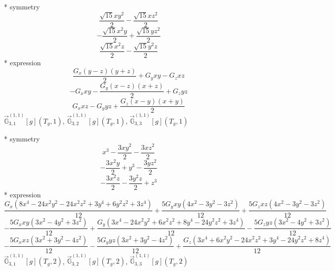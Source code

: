 \documentclass[fleqn,8pt]{jsarticle}
\begin{document}
\noindent\quad ** symmetry
\begin{dmath*}
\frac{\sqrt{15} x y^{2}}{2} - \frac{\sqrt{15} x z^{2}}{2}
\end{dmath*}
\begin{dmath*}
- \frac{\sqrt{15} x^{2} y}{2} + \frac{\sqrt{15} y z^{2}}{2}
\end{dmath*}
\begin{dmath*}
\frac{\sqrt{15} x^{2} z}{2} - \frac{\sqrt{15} y^{2} z}{2}
\end{dmath*}
\noindent\quad ** expression
\begin{dmath*}
\frac{G_{x} \left(y - z\right) \left(y + z\right)}{2} + G_{y} x y - G_{z} x z
\end{dmath*}
\begin{dmath*}
- G_{x} x y - \frac{G_{y} \left(x - z\right) \left(x + z\right)}{2} + G_{z} y z
\end{dmath*}
\begin{dmath*}
G_{x} x z - G_{y} y z + \frac{G_{z} \left(x - y\right) \left(x + y\right)}{2}
\end{dmath*}
\noindent\quad $\vec{\mathbb{G}}_{3,1}^{(1,1)}[g](T_{g},1)$, $\vec{\mathbb{G}}_{3,2}^{(1,1)}[g](T_{g},1)$, $\vec{\mathbb{G}}_{3,3}^{(1,1)}[g](T_{g},1)$

\noindent\quad ** symmetry
\begin{dmath*}
x^{3} - \frac{3 x y^{2}}{2} - \frac{3 x z^{2}}{2}
\end{dmath*}
\begin{dmath*}
- \frac{3 x^{2} y}{2} + y^{3} - \frac{3 y z^{2}}{2}
\end{dmath*}
\begin{dmath*}
- \frac{3 x^{2} z}{2} - \frac{3 y^{2} z}{2} + z^{3}
\end{dmath*}
\noindent\quad ** expression
\begin{dmath*}
\frac{G_{x} \left(8 x^{4} - 24 x^{2} y^{2} - 24 x^{2} z^{2} + 3 y^{4} + 6 y^{2} z^{2} + 3 z^{4}\right)}{12} + \frac{5 G_{y} x y \left(4 x^{2} - 3 y^{2} - 3 z^{2}\right)}{12} + \frac{5 G_{z} x z \left(4 x^{2} - 3 y^{2} - 3 z^{2}\right)}{12}
\end{dmath*}
\begin{dmath*}
- \frac{5 G_{x} x y \left(3 x^{2} - 4 y^{2} + 3 z^{2}\right)}{12} + \frac{G_{y} \left(3 x^{4} - 24 x^{2} y^{2} + 6 x^{2} z^{2} + 8 y^{4} - 24 y^{2} z^{2} + 3 z^{4}\right)}{12} - \frac{5 G_{z} y z \left(3 x^{2} - 4 y^{2} + 3 z^{2}\right)}{12}
\end{dmath*}
\begin{dmath*}
- \frac{5 G_{x} x z \left(3 x^{2} + 3 y^{2} - 4 z^{2}\right)}{12} - \frac{5 G_{y} y z \left(3 x^{2} + 3 y^{2} - 4 z^{2}\right)}{12} + \frac{G_{z} \left(3 x^{4} + 6 x^{2} y^{2} - 24 x^{2} z^{2} + 3 y^{4} - 24 y^{2} z^{2} + 8 z^{4}\right)}{12}
\end{dmath*}
\noindent\quad $\vec{\mathbb{G}}_{3,1}^{(1,1)}[g](T_{g},2)$, $\vec{\mathbb{G}}_{3,2}^{(1,1)}[g](T_{g},2)$, $\vec{\mathbb{G}}_{3,3}^{(1,1)}[g](T_{g},2)$
\end{document}
